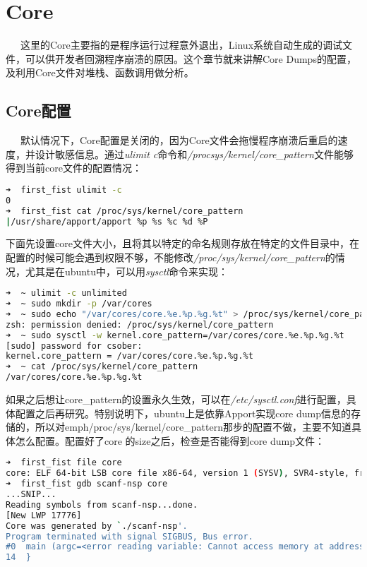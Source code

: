 \documentclass[12pt]{article}  %
\begin{document}
\begin{lstlisting}[language=sh]

\end{lstlisting}


\section{Core} %
\ \ \ 这里的Core主要指的是程序运行过程意外退出，Linux系统自动生成的调试文件，可以供开发者回溯程序崩溃的原因。这个章节就来讲解Core Dumps的配置，及利用Core文件对堆栈、函数调用做分析。
\label{sec:玩转数学公式}
\subsection{Core配置}
\ \ \ 默认情况下，Core配置是关闭的，因为Core文件会拖慢程序崩溃后重启的速度，并设计敏感信息。通过\emph{ulimit \-c}命令和\emph{/procsys/kernel/core\_pattern}文件能够得到当前core文件的配置情况：\par
\begin{lstlisting}[language=sh]
➜  first_fist ulimit -c
0
➜  first_fist cat /proc/sys/kernel/core_pattern 
|/usr/share/apport/apport %p %s %c %d %P
\end{lstlisting}\par
下面先设置core文件大小，且将其以特定的命名规则存放在特定的文件目录中，在配置的时候可能会遇到权限不够，不能修改\emph{/proc/sys/kernel/core\_pattern}的情况，尤其是在ubuntu中，可以用\emph{sysctl}命令来实现：
\begin{lstlisting}[language=sh]
➜  ~ ulimit -c unlimited
➜  ~ sudo mkdir -p /var/cores
➜  ~ sudo echo "/var/cores/core.%e.%p.%g.%t" > /proc/sys/kernel/core_pattern
zsh: permission denied: /proc/sys/kernel/core_pattern
➜  ~ sudo sysctl -w kernel.core_pattern=/var/cores/core.%e.%p.%g.%t
[sudo] password for csober: 
kernel.core_pattern = /var/cores/core.%e.%p.%g.%t
➜  ~ cat /proc/sys/kernel/core_pattern 
/var/cores/core.%e.%p.%g.%t

\end{lstlisting}\par
如果之后想让core\_pattern的设置永久生效，可以在\emph{/etc/sysctl.conf}进行配置，具体配置之后再研究。特别说明下，ubuntu上是依靠Apport实现core dump信息的存储的，所以对emph{/proc/sys/kernel/core\_pattern}那步的配置不做，主要不知道具体怎么配置。配置好了core 的size之后，检查是否能得到core dump文件：
\begin{lstlisting}[language=sh]
➜  first_fist file core 
core: ELF 64-bit LSB core file x86-64, version 1 (SYSV), SVR4-style, from './scanf-nsp'
➜  first_fist gdb scanf-nsp core 
...SNIP...
Reading symbols from scanf-nsp...done.
[New LWP 17776]
Core was generated by `./scanf-nsp'.
Program terminated with signal SIGBUS, Bus error.
#0  main (argc=<error reading variable: Cannot access memory at address 0xf7ffffffd99c>, argv=<error reading variable: Cannot access memory at address 0xf7ffffffd990>) at scanf.c:14
14	}
\end{lstlisting}\par
\end{document}
